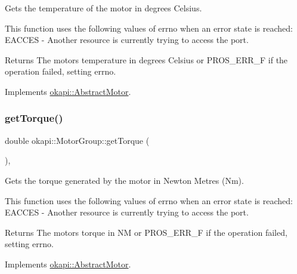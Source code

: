 Gets the temperature of the motor in degrees Celsius.

This function uses the following values of errno when an error state is reached\+: E\+A\+C\+C\+ES -\/ Another resource is currently trying to access the port.

\begin{DoxyReturn}{Returns}
The motor\textquotesingle{}s temperature in degrees Celsius or P\+R\+O\+S\+\_\+\+E\+R\+R\+\_\+F if the operation failed, setting errno. 
\end{DoxyReturn}


Implements \mbox{\hyperlink{classokapi_1_1AbstractMotor_a96ef2dc7eeb1ac23713e3e37af9e95f2}{okapi\+::\+Abstract\+Motor}}.

\mbox{\label{classokapi_1_1MotorGroup_a591e2ac0cc80b58f6b5b767c5d0128c5}} 
\subsubsection{\texorpdfstring{getTorque()}{getTorque()}}
{\footnotesize\ttfamily double okapi\+::\+Motor\+Group\+::get\+Torque (\begin{DoxyParamCaption}{ }\end{DoxyParamCaption})\hspace{0.3cm}{\ttfamily [override]}, {\ttfamily [virtual]}}

Gets the torque generated by the motor in Newton Metres (Nm).

This function uses the following values of errno when an error state is reached\+: E\+A\+C\+C\+ES -\/ Another resource is currently trying to access the port.

\begin{DoxyReturn}{Returns}
The motor\textquotesingle{}s torque in NM or P\+R\+O\+S\+\_\+\+E\+R\+R\+\_\+F if the operation failed, setting errno. 
\end{DoxyReturn}


Implements \mbox{\hyperlink{classokapi_1_1AbstractMotor_a955818baa689b279b36dda6a74f15d4e}{okapi\+::\+Abstract\+Motor}}.

\mbox{\label{classokapi_1_1MotorGroup_a399d4a16683c5498483f1f1e5e6307b5}} 
